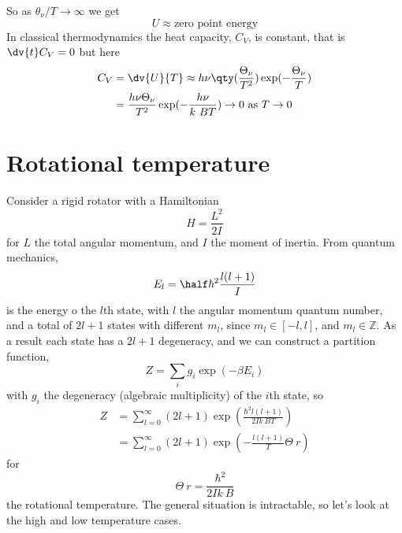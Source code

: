 So as $\theta_{\nu}/T \to \infty$ we get
\begin{equation}
  \label{eq:4}
  U \approx \text{zero point energy}
\end{equation}
In classical thermodynamics the heat capacity, $C_{V}$, is constant,
that is $\dv{t} C_V = 0$ but here
\begin{align*}
  C_V &= \dv{U}{T} \approx h \nu \qty( \frac{\Theta_{\nu}}{T^2}) \exp(- \frac{\Theta_{\nu}}{T}) \\
&= \frac{h \nu \Theta_{\nu}}{T^2} \exp(- \frac{h \nu}{k~B T}) \to 0 \ \text{as} \ T \to 0
\end{align*}

\section{Rotational temperature}
\label{sec:rotat-temp}

Consider a rigid rotator with a Hamiltonian 
\begin{equation}
  \label{eq:23}
  H = \frac{L^2}{2 I}
\end{equation}
for $L$ the total angular momentum, and $I$ the moment of
inertia. From quantum mechanics,
\begin{equation}
  \label{eq:24}
  E_l = \half \hbar^2 \frac{l(l+1)}{I}
\end{equation}
is the energy o the $l$th state, with $l$ the angular momentum quantum
number, and a total of $2l +1$ states with different $m_l$, since $m_l
\in [-l, l]$, and $m_l \in \mathbb{Z}$. As a result each state has a
$2l+1$ degeneracy, and we can construct a partition function,
\begin{equation}
  \label{eq:25}
  Z = \sum_i g_i \exp(- \beta E_i )
\end{equation}
with $g_i$ the degeneracy (algebraic multiplicity) of the $i$th state,
so
\begin{subequations}
\begin{align}
  \label{eq:26}
  Z &= \sum_{l=0}^{\infty} (2 l + 1) \exp( \frac{\hbar^2 l(l+1)}{2 I k~B T} )\\
\label{eq:27}
&= \sum_{l=0}^{\infty} (2l+1) \exp( - \frac{l(l+1)}{T} \Theta~r )
\end{align}
\end{subequations}
for 
\begin{equation}
  \label{eq:28}
  \Theta~r = \frac{\hbar^2}{2 I k~B}
\end{equation}
the rotational temperature. The general situation is intractable, so
let's look at the high and low temperature cases.

